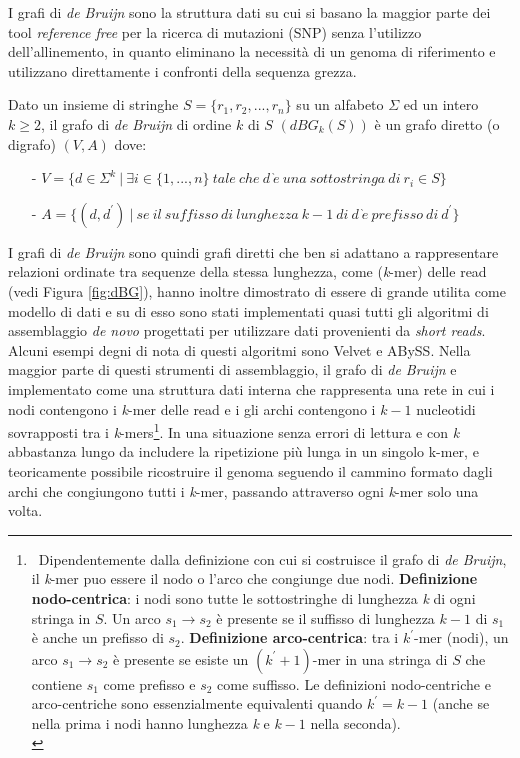 \documentclass[../main.tex]{subfiles}
\begin{document}
I grafi di \textit{de Bruijn} sono la struttura dati su cui si basano la maggior parte dei tool \textit{reference free} per la  ricerca di mutazioni (SNP) senza l'utilizzo dell'allinemento, in quanto eliminano la necessità di un genoma di riferimento e utilizzano direttamente i confronti della sequenza grezza.

\theoremstyle{definition}
\begin{definition} 
Dato un insieme di stringhe $S = \{r_1 , r_2 , ... , r_n\}$ su un alfabeto $\Sigma$ ed un intero $k\geq2$, il grafo di \textit{de Bruijn} di ordine $k$ di $S$ $(dBG_k (S))$ è un grafo diretto (o digrafo) $(V,A)$ dove:
\begin{itemize}
\item[-] $V = \{d \in \Sigma^k \ |\  \exists i \in \{1, ..., n\} \ tale\ che\ d\ \grave{e}\ una\ sottostringa\ di\ r_i \in S\}$
\item[-]$A = \{ (d,d^\prime)\ |\ se\ il\ suffisso\ di\ lunghezza\ k-1\ di\ d\ \grave{e}\ prefisso\ di\ d^\prime\}$
\end{itemize}
\end{definition}

\noindent
I grafi di \textit{de Bruijn} sono quindi grafi diretti che ben si adattano a rappresentare relazioni ordinate tra sequenze della stessa lunghezza, come (\textit{k}-mer) delle read (vedi Figura \ref{fig:dBG}), hanno inoltre dimostrato di essere di grande utilita come modello di dati e su di esso sono stati implementati quasi tutti gli algoritmi di assemblaggio \textit{de novo} progettati per utilizzare dati provenienti da \textit{short reads}. Alcuni esempi degni di nota di questi algoritmi sono Velvet e ABySS. Nella maggior parte di questi strumenti di assemblaggio, il grafo di \textit{de Bruijn} e implementato come una struttura dati interna che rappresenta una rete in cui i nodi contengono i \textit{k}-mer delle read e i gli archi contengono i $k-1$ nucleotidi sovrapposti tra i \textit{k}-mers\footnote{\ Dipendentemente dalla definizione con cui si costruisce il grafo di \textit{de Bruijn}, il \textit{k}-mer puo essere il nodo o l'arco che congiunge due nodi. \textbf{Definizione nodo-centrica}: i nodi sono tutte le sottostringhe di lunghezza \textit{k} di ogni stringa in $S$. Un arco $s_1 \rightarrow s_2$ è presente se il suffisso di lunghezza $k-1$ di $s_1$ è anche un prefisso di $s_2$. \textbf{Definizione arco-centrica}: tra i $k^\prime$-mer (nodi), un arco $s_1 \rightarrow s_2$ è presente se esiste un $(k^\prime+1)$-mer in una stringa di $S$ che contiene $s_1$ come prefisso e $s_2$ come suffisso. Le definizioni nodo-centriche e arco-centriche sono essenzialmente equivalenti quando $k^\prime = k-1$ (anche se nella prima i nodi hanno lunghezza \textit{k} e $k - 1$ nella seconda).\\}. In una situazione senza errori di lettura e con \textit{k} abbastanza lungo da includere la ripetizione più lunga in un singolo k-mer, e teoricamente possibile ricostruire il genoma seguendo il cammino formato dagli archi che congiungono tutti i \textit{k}-mer, passando attraverso ogni \textit{k}-mer solo una volta. 
\end{document}
